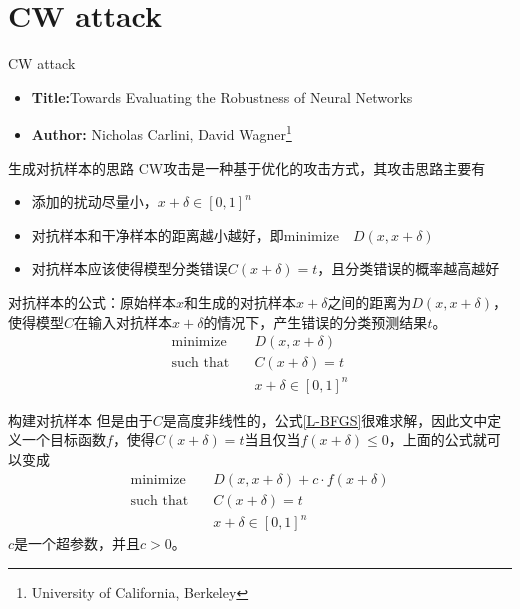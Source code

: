 \section{CW attack}


\begin{frame}{CW attack}
    \begin{itemize}
        \item \textbf{Title:}Towards Evaluating the Robustness of Neural Networks
        \item \textbf{Author:} Nicholas Carlini, David Wagner\footnote{University of California, Berkeley}
    \end{itemize}
\end{frame}

\begin{frame}{生成对抗样本的思路}
    CW攻击是一种基于优化的攻击方式，其攻击思路主要有
    \begin{itemize}
        \item 添加的扰动尽量小，$x+\delta \in [0,1]^n$
        \item 对抗样本和干净样本的距离越小越好，即$\text{minimize}\quad D(x,x+\delta)$
        \item 对抗样本应该使得模型分类错误$C(x+\delta)=t$，且分类错误的概率越高越好
    \end{itemize}

    对抗样本的公式：原始样本$x$和生成的对抗样本$x+\delta$之间的距离为$D(x,x+\delta)$，使得模型$C$在输入对抗样本$x+\delta$的情况下，产生错误的分类预测结果$t$。
    \begin{equation}
        \begin{aligned}
            \text{minimize}\quad    & D(x,x+\delta) \\
            \text{such that}\quad   & C(x+\delta)=t \\
                                    & x+\delta \in [0,1]^n
        \end{aligned}
        \label{L-BFGS}
    \end{equation}    
\end{frame}

\begin{frame}{构建对抗样本}
    但是由于$C$是高度非线性的，公式\ref{L-BFGS}很难求解，因此文中定义一个目标函数$f$，使得$C(x+\delta)=t$当且仅当$f(x+\delta)\leq 0$，上面的公式就可以变成
    \begin{equation}
        \begin{aligned}
            \text{minimize}\quad    & D(x,x+\delta)+c\cdot f(x+\delta) \\
            \text{such that}\quad   & C(x+\delta)=t \\
                                    & x+\delta \in [0,1]^n
        \end{aligned}
    \end{equation}
    $c$是一个超参数，并且$c>0$。
\end{frame}


